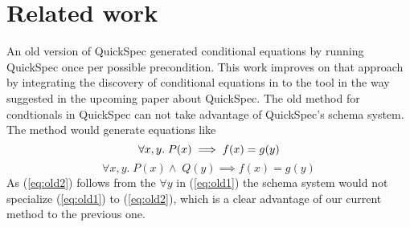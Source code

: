 \section{Related work}
An old version of QuickSpec generated conditional
equations by running QuickSpec once per possible precondition.
This work improves on that approach by integrating the
discovery of conditional equations in to the tool
in the way suggested in the upcoming paper about
QuickSpec.
The old method for condtionals in QuickSpec can 
not take advantage of QuickSpec's schema system.
The method would generate equations like
\begin{equation}\label{eq:old1}
    \forall x, y.\;P(x)\implies f(x) = g(y)\\
\end{equation}
\begin{equation}\label{eq:old2}
    \forall x, y.\;P(x)\wedge\;Q(y)\implies f(x) = g(y)
\end{equation}
As (\ref{eq:old2}) follows from the $\forall y$ in (\ref{eq:old1})
the schema system would not specialize (\ref{eq:old1}) to
(\ref{eq:old2}), which is a clear advantage of
our current method to the previous one.
